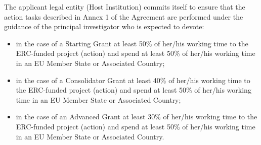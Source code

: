\documentclass[12pt]{scrartcl}
\begin{document}
The applicant legal entity (Host Institution) commits itself to ensure that the
action tasks described in Annex 1 of the Agreement are performed under the
guidance of the principal investigator who is expected to devote:
\begin{itemize}
    \item in the case of a Starting Grant at least 50\% of her/his working time to
    the ERC-funded project (action) and spend at least 50\% of her/his working
    time in an EU Member State or Associated Country;

    \item in the case of a Consolidator Grant at least 40\% of her/his working
    time to the ERC-funded project (action) and spend at least 50\% of her/his
    working time in an EU Member State or Associated Country;

    \item in the case of an Advanced Grant at least 30\% of her/his working time
    to the ERC-funded project (action) and spend at least 50\% of her/his
    working time in an EU Member State or Associated Country.
\end{itemize}
\end{document}
